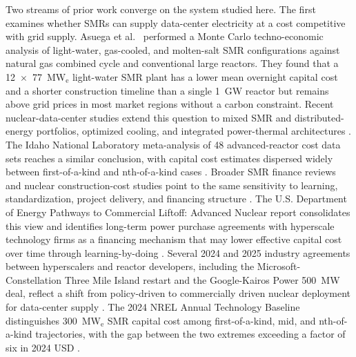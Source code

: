 \documentclass[a4paper,fleqn]{cas-sc}
\begin{document}
Two streams of prior work converge on the system studied here. The first examines whether SMRs can supply data-center electricity at a cost competitive with grid supply. Asuega et al.~\citep{asuega2023} performed a Monte Carlo techno-economic analysis of light-water, gas-cooled, and molten-salt SMR configurations against natural gas combined cycle and conventional large reactors. They found that a 12~$\times$~77~MW$_\mathrm{e}$ light-water SMR plant has a lower mean overnight capital cost and a shorter construction timeline than a single 1~GW reactor but remains above grid prices in most market regions without a carbon constraint. Recent nuclear-data-center studies extend this question to mixed SMR and distributed-energy portfolios, optimized cooling, and integrated power-thermal architectures \citep{debnath2025smrDER,you2025dynamicEquilibrium,bhowmik2026nuclearDC,zhang2026nuclearDC}. The Idaho National Laboratory meta-analysis of 48 advanced-reactor cost data sets reaches a similar conclusion, with capital cost estimates dispersed widely between first-of-a-kind and nth-of-a-kind cases \citep{inl2024metaanalysis}. Broader SMR finance reviews and nuclear construction-cost studies point to the same sensitivity to learning, standardization, project delivery, and financing structure \citep{mignacca2020smrFinance,nea2020constructionCost}. The U.S. Department of Energy Pathways to Commercial Liftoff: Advanced Nuclear report consolidates this view and identifies long-term power purchase agreements with hyperscale technology firms as a financing mechanism that may lower effective capital cost over time through learning-by-doing \citep{doe2024liftoff}. Several 2024 and 2025 industry agreements between hyperscalers and reactor developers, including the Microsoft-Constellation Three Mile Island restart and the Google-Kairos Power 500~MW deal, reflect a shift from policy-driven to commercially driven nuclear deployment for data-center supply \citep{eia2024nuclearDC}. The 2024 NREL Annual Technology Baseline distinguishes 300~MW$_\mathrm{e}$ SMR capital cost among first-of-a-kind, mid, and nth-of-a-kind trajectories, with the gap between the two extremes exceeding a factor of six in 2024 USD \citep{atb2024nuclear}.
\end{document}

